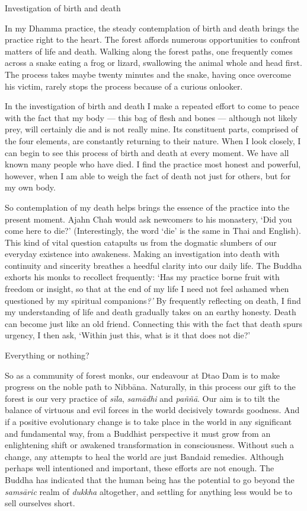 Investigation of birth and death

In my Dhamma practice, the steady contemplation of birth and death
brings the practice right to the heart. The forest affords numerous
opportunities to confront matters of life and death. Walking along the
forest paths, one frequently comes across a snake eating a frog or
lizard, swallowing the animal whole and head first. The process takes
maybe twenty minutes and the snake, having once overcome his victim,
rarely stops the process because of a curious onlooker.

In the investigation of birth and death I make a repeated effort to come
to peace with the fact that my body --- this bag of flesh and bones ---
although not likely prey, will certainly die and is not really mine. Its
constituent parts, comprised of the four elements, are constantly
returning to their nature. When I look closely, I can begin to see this
process of birth and death at every moment. We have all known many
people who have died. I find the practice most honest and powerful,
however, when I am able to weigh the fact of death not just for others,
but for my own body.

So contemplation of my death helps brings the essence of the practice
into the present moment. Ajahn Chah would ask newcomers to his
monastery, `Did you come here to die?' (Interestingly, the word `die' is
the same in Thai and English). This kind of vital question catapults us
from the dogmatic slumbers of our everyday existence into awakeness.
Making an investigation into death with continuity and sincerity
breathes a heedful clarity into our daily life. The Buddha exhorts his
monks to recollect frequently: `Has my practice borne fruit with freedom
or insight, so that at the end of my life I need not feel ashamed when
questioned by my spiritual companions\emph{?'} By frequently reflecting
on death, I find my understanding of life and death gradually takes on
an earthy honesty. Death can become just like an old friend. Connecting
this with the fact that death spurs urgency, I then ask, `Within just
this, what is it that does not die?'

Everything or nothing?

So as a community of forest monks, our endeavour at Dtao Dam is to make
progress on the noble path to Nibbāna. Naturally, in this process our
gift to the forest is our very practice of \emph{sīla}, \emph{samādhi}
and \emph{paññā}. Our aim is to tilt the balance of virtuous and evil
forces in the world decisively towards goodness. And if a positive
evolutionary change is to take place in the world in any significant and
fundamental way, from a Buddhist perspective it must grow from an
enlightening shift or awakened transformation in consciousness. Without
such a change, any attempts to heal the world are just Bandaid remedies.
Although perhaps well intentioned and important, these efforts are not
enough. The Buddha has indicated that the human being has the potential
to go beyond the \emph{samsāric} realm of \emph{dukkha} altogether, and
settling for anything less would be to sell ourselves short.

